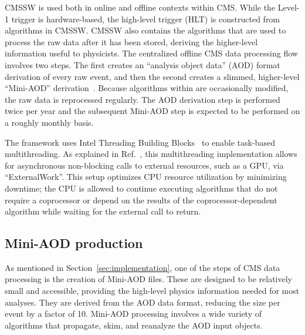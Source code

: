CMSSW is used both in online and offline contexts within CMS. While the Level-1 trigger is hardware-based, the high-level trigger (HLT) is constructed from algorithms in CMSSW. CMSSW also contains the algorithms that are used to process the raw data after it has been stored, deriving the higher-level information useful to physicists. The centralized offline CMS data processing flow involves two steps. The first creates an ``analysis object data'' (AOD) format derivation of every raw event, and then the second creates a slimmed, higher-level ``Mini-AOD'' derivation~\cite{Petrucciani:2015gjw}. Because algorithms within \CMSSW are occasionally modified, the raw data is reprocessed regularly. The AOD derivation step is performed twice per year and the subsequent Mini-AOD step is expected to be performed on a roughly monthly basis.

The \CMSSW framework uses Intel Threading Building Blocks~\cite{tbb} to enable task-based multithreading. As explained in Ref.~\cite{Bocci:2020olh}, this multithreading implementation allows for asynchronous non-blocking calls to external resources, such as a GPU, via ``ExternalWork''. This setup optimizes CPU resource utilization by minimizing downtime; the CPU is allowed to continue executing algorithms that do not require a coprocessor or depend on the results of the coprocessor-dependent algorithm while waiting for the external call to return.

\subsection{Mini-AOD production}
\label{sec:miniaod_production}
As mentioned in Section~\ref{sec:implementation}, one of the steps of CMS data processing is the creation of Mini-AOD files. These are designed to be relatively small and accessible, providing the high-level physics information needed for most analyses. They are derived from the AOD data format, reducing the size per event by a factor of 10. Mini-AOD processing involves a wide variety of algorithms that propagate, skim, and reanalyze the AOD input objects. 